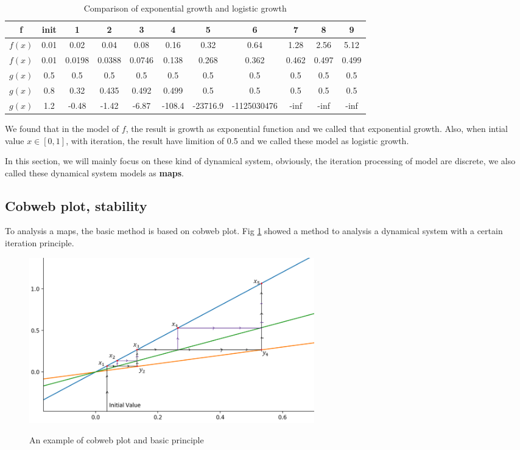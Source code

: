 \documentclass[12pt]{article}
\theoremstyle{plain}
\begin{document}
\begin{table}[H]
\centering  
\caption{Comparison of exponential growth and logistic growth}  
\begin{tabular}{|c||c|c|c|c|c|c|c|c|c|c|}
\hline
f & init & 1 & 2 & 3 & 4 & 5 & 6 & 7 & 8 & 9 \\
\hline
\hline
$f(x)$ & 0.01 & 0.02   & 0.04   & 0.08   & 0.16   & 0.32     & 0.64        & 1.28  & 2.56  & 5.12  \\
\hline
$f(x)$ & 0.01 & 0.0198 & 0.0388 & 0.0746 & 0.138  & 0.268    & 0.362       & 0.462 & 0.497 & 0.499 \\
\hline
$g(x)$ & 0.5  & 0.5    & 0.5    & 0.5    & 0.5    & 0.5      & 0.5         & 0.5   & 0.5   & 0.5   \\
\hline
$g(x)$ & 0.8  & 0.32   & 0.435  & 0.492  & 0.499  & 0.5      & 0.5         & 0.5   & 0.5   & 0.5   \\
\hline
$g(x)$ & 1.2  & -0.48  & -1.42  & -6.87  & -108.4 & -23716.9 & -1125030476 & -inf  & -inf  & -inf  \\
\hline
\end{tabular}  
\end{table}  

We found that in the model of $f$, the result is growth as exponential function and we called that exponential growth. Also, when intial value $x \in [0, 1]$, with iteration, the result have limition of 0.5 and we called these model as logistic growth.

In this section, we will mainly focus on these kind of dynamical system, obviously, the iteration processing of model are discrete, we also called these dynamical system models as \textbf{maps}.






\subsection{Cobweb plot, stability}
To analysis a maps, the basic method is based on cobweb plot. Fig \ref{cobweb-plow-1} showed a method to analysis a dynamical system with a certain iteration principle. 
\begin{figure}[H]
\begin{center}
\includegraphics[width=0.6\textwidth]{figure/section1/cobweb-plot.png} \\
\caption{An example of cobweb plot and basic principle}\label{cobweb-plow-1}
\end{center}
\end{figure}
\end{document}
